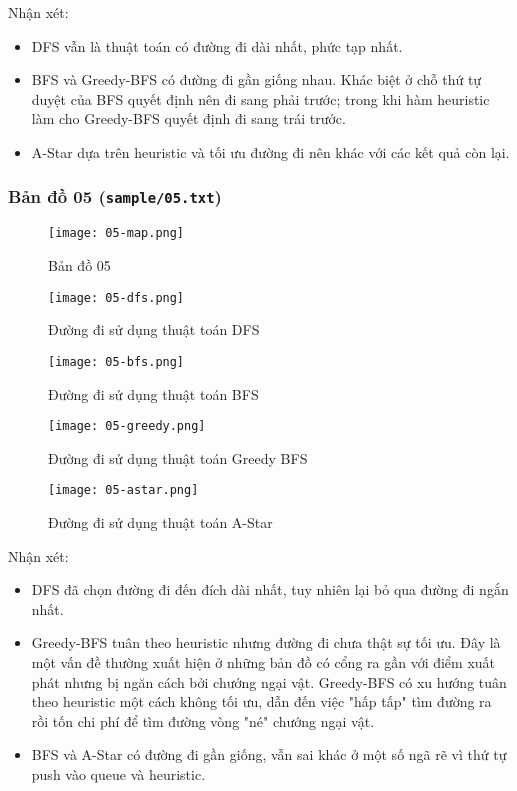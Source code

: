 \documentclass[12pt]{article}
\begin{document}
Nhận xét:
\begin{itemize}
\item DFS vẫn là thuật toán có đường đi dài nhất, phức tạp nhất.
\item BFS và Greedy-BFS có đường đi gần giống nhau. Khác biệt ở chỗ thứ tự duyệt của BFS quyết định nên đi sang phải trước; trong khi hàm heuristic làm cho Greedy-BFS quyết định đi sang trái trước. 
\item A-Star dựa trên heuristic và tối ưu đường đi nên khác với các kết quả còn lại.
\end{itemize}

\subsubsection{Bản đồ 05 (\texttt{sample/05.txt})}
\begin{figure}[H]
	\centering
	\texttt{[image: 05-map.png]}
	\caption{Bản đồ 05}
\end{figure}

\begin{figure}[H]
	\centering
	\texttt{[image: 05-dfs.png]}
	\caption{Đường đi sử dụng thuật toán DFS}
\end{figure}

\begin{figure}[H]
	\centering
	\texttt{[image: 05-bfs.png]}
	\caption{Đường đi sử dụng thuật toán BFS}
\end{figure}

\begin{figure}[H]
	\centering
	\texttt{[image: 05-greedy.png]}
	\caption{Đường đi sử dụng thuật toán Greedy BFS}
\end{figure}

\begin{figure}[H]
	\centering
	\texttt{[image: 05-astar.png]}
	\caption{Đường đi sử dụng thuật toán A-Star}
\end{figure}

Nhận xét:
\begin{itemize}
\item DFS đã chọn đường đi đến đích dài nhất, tuy nhiên lại bỏ qua đường đi ngắn nhất.
\item Greedy-BFS tuân theo heuristic nhưng đường đi chưa thật sự tối ưu. Đây là một vấn đề thường xuất hiện ở những bản đồ có cổng ra gần với điểm xuất phát nhưng bị ngăn cách bởi chướng ngại vật. Greedy-BFS có xu hướng tuân theo heuristic một cách không tối ưu, dẫn đến việc "hấp tấp" tìm đường ra rồi tốn chi phí để tìm đường vòng "né" chướng ngại vật.
\item BFS và A-Star có đường đi gần giống, vẫn sai khác ở một số ngã rẽ vì thứ tự push vào queue và heuristic.
\end{itemize}
\end{document}

